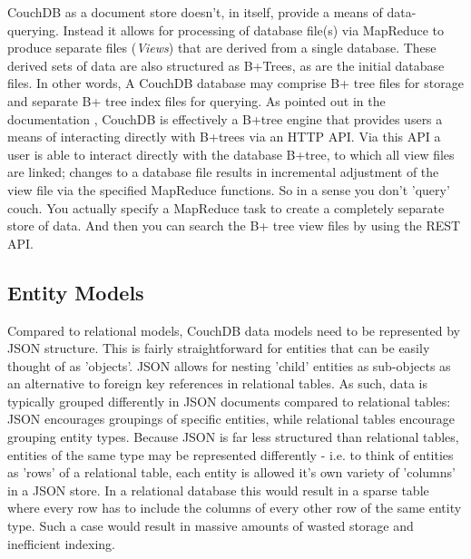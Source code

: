 CouchDB as a document store doesn't, in itself, provide a means of data-querying. Instead it allows for processing of database file(s) via MapReduce to produce separate files (\textit{Views}) that are derived from a single database. These derived sets of data are also structured as B+Trees, as are the initial database files. In other words, A CouchDB database may comprise B+ tree files for storage and separate B+ tree index files for querying. As pointed out in the documentation \cite{couchguide}, CouchDB is effectively a B+tree engine that provides users a means of interacting directly with B+trees via an HTTP API. Via this API a user is able to interact directly with the database B+tree, to which all view files are linked; changes to a database file results in incremental adjustment of the view file via the specified MapReduce functions. So in a sense you don’t 'query' couch. You actually specify a MapReduce task to create a completely separate store of data. And then you can search the B+ tree view files by using the REST API.

\subsection{Entity Models}
Compared to relational models, CouchDB data models need to be represented by JSON structure. This is fairly straightforward for entities that can be easily thought of as 'objects'. JSON allows for nesting 'child' entities as sub-objects as an alternative to foreign key references in relational tables. As such, data is typically grouped differently in JSON documents compared to relational tables: JSON encourages groupings of specific entities, while relational tables encourage grouping entity types. Because JSON is far less structured than relational tables, entities of the same type may be represented differently - i.e. to think of entities as 'rows' of a relational table, each entity is allowed it's own variety of 'columns' in a JSON store. In a relational database this would result in a sparse table where every row has to include the columns of every other row of the same entity type. Such a case would result in massive amounts of wasted storage and inefficient indexing.